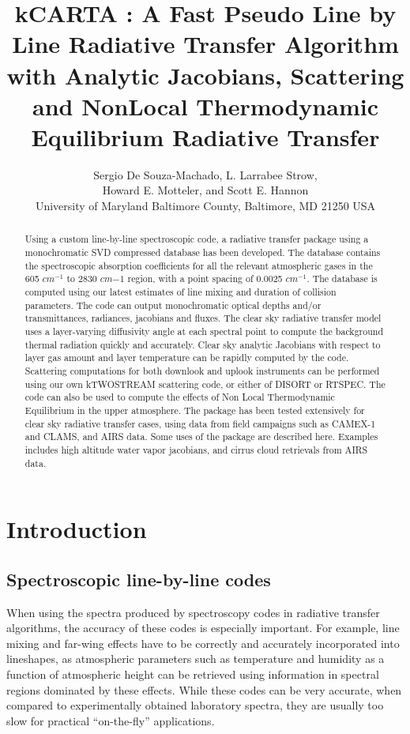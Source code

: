 \documentclass[11pt]{article}
\title{kCARTA : A Fast Pseudo Line by Line Radiative Transfer Algorithm with
                Analytic Jacobians, Scattering and NonLocal Thermodynamic 
                Equilibrium Radiative Transfer}
\author{Sergio De Souza-Machado, L. Larrabee Strow,\\
       Howard E. Motteler, and Scott E. Hannon\\
       University of Maryland Baltimore County, Baltimore, MD 21250 USA}
\begin{document}
\maketitle

\begin{abstract}
  
  Using a custom line-by-line spectroscopic code, a radiative transfer package
  using a monochromatic \textsf{SVD} compressed database has been developed. 
  The database 
  contains the spectroscopic absorption coefficients for all the relevant
  atmospheric gases in the 605 $cm^{-1}$ to 2830 $cm{-1}$ region, with a 
  point spacing of 0.0025 $cm^{-1}$. The \cd database is computed using our 
  latest estimates of line mixing and duration of collision parameters. The 
  code can output monochromatic optical depths and/or transmittances, 
  radiances, jacobians and fluxes. The clear sky radiative transfer model 
  uses a layer-varying diffusivity angle at each spectral point to compute the 
  background thermal radiation quickly and accurately. Clear sky analytic 
  Jacobians with respect to layer gas amount and layer temperature can be 
  rapidly computed by the code. Scattering computations for both downlook and
  uplook instruments can be performed using our own \textsf{kTWOSTREAM} 
  scattering code, or either of \textsf{DISORT} or \textsf{RTSPEC}.
  The code can also be used to compute the effects of Non Local Thermodynamic
  Equilibrium in the upper atmosphere. The package has been tested extensively
  for clear sky radiative transfer cases, using data from field campaigns such
  as CAMEX-1 and CLAMS, and AIRS data.
  Some uses of the package are described here. Examples includes high
  altitude water vapor jacobians, and cirrus cloud retrievals from AIRS data.

\end{abstract}

\section{Introduction}

\subsection{Spectroscopic line-by-line codes}

When using the spectra produced by spectroscopy codes in radiative transfer
algorithms, the accuracy of these codes is especially important.
For example, line mixing and far-wing effects have to be correctly and
accurately incorporated into lineshapes, as atmospheric parameters 
such as temperature and humidity as a function of atmospheric height can be
retrieved using information in spectral regions dominated by these effects. 
While these codes can be very accurate, when compared to experimentally 
obtained laboratory spectra, they are usually too slow for practical 
``on-the-fly'' applications.
\end{document}
